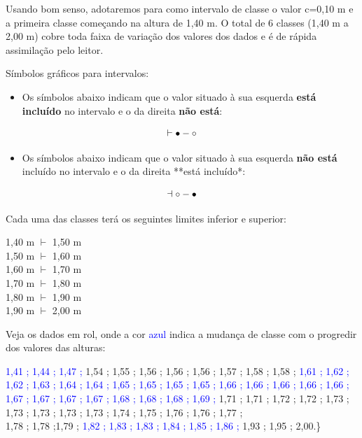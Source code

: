 \documentclass[
]{book}
\providecommand{\tightlist}{%
  \setlength{\itemsep}{0pt}\setlength{\parskip}{0pt}}
\begin{document}
Usando bom senso, adotaremos para como intervalo de classe o valor c=0,10 m e a primeira classe começando na altura de 1,40 m.
O total de 6 classes (1,40 m a 2,00 m) cobre toda faixa de variação dos valores dos dados e é de rápida assimilação pelo leitor.

Símbolos gráficos para intervalos:

\begin{itemize}
\tightlist
\item
  Os símbolos abaixo indicam que o valor situado à sua esquerda \textbf{está incluído} no intervalo e o da direita \textbf{não está}:
\end{itemize}

\[
\vdash \\
{\bullet}-{\circ}
\]

\begin{itemize}
\tightlist
\item
  Os símbolos abaixo indicam que o valor situado à sua esquerda \textbf{não está} incluído no intervalo e o da direita **está incluído*:
\end{itemize}

\[
\dashv  \\
{\circ}-{\bullet}
\]

Cada uma das classes terá os seguintes limites inferior e superior:

\hfill\break

1,40 m \(\vdash\) 1,50 m\\
1,50 m \(\vdash\) 1,60 m\\
1,60 m \(\vdash\) 1,70 m\\
1,70 m \(\vdash\) 1,80 m\\
1,80 m \(\vdash\) 1,90 m\\
1,90 m \(\vdash\) 2,00 m

\hfill\break

Veja os dados em rol, onde a cor \textcolor{blue}{azul} indica a mudança de classe com o progredir dos valores das alturas:

\hfill\break

\textcolor{blue}{1,41 ; 1,44 ; 1,47 ;}
1,54 ; 1,55 ; 1,56 ; 1,56 ; 1,56 ; 1,57 ; 1,58 ; 1,58 ;
\textcolor{blue}{1,61 ; 1,62 ; 1,62 ; 1,63 ; 1,64 ;  
1,64 ; 1,65 ; 1,65 ; 1,65 ; 1,65 ; 1,66 ; 1,66 ; 1,66 ; 1,66 ; 1,66 ; 1,67 ; 1,67 ; 1,67 ; 1,67 ; 1,68 ; 1,68 ;  
1,68 ; 1,69 ;}
1,71 ; 1,71 ; 1,72 ; 1,72 ; 1,73 ; 1,73 ; 1,73 ; 1,73 ; 1,73 ; 1,74 ; 1,75 ; 1,76 ; 1,76 ; 1,77 ;\\
1,78 ; 1,78 ;1,79 ; \textcolor{blue}{1,82 ; 1,83 ; 1,83 ; 1,84 ; 1,85 ; 1,86 ; } 1,93 ; 1,95 ; 2,00.\}
\end{document}
